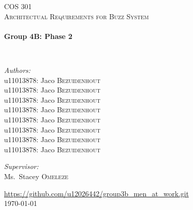 
\begin{titlepage}
\begin{center}


\textsc{\LARGE COS 301}\\[1.5cm]

\textsc{\large Architectual Requirements for Buzz System}\\[0.5cm]

\HRule \\[0.4cm]
{ \huge \bfseries Group 4B: Phase 2 \\[0.4cm] }

\HRule \\[1.5cm]

\noindent
\begin{minipage}{0.4\textwidth}
\begin{flushleft} \large
\emph{Authors:}\\
u11013878: Jaco \textsc{Bezuidenhout}\\
u11013878: Jaco \textsc{Bezuidenhout}\\
u11013878: Jaco \textsc{Bezuidenhout}\\
u11013878: Jaco \textsc{Bezuidenhout}\\
u11013878: Jaco \textsc{Bezuidenhout}\\
u11013878: Jaco \textsc{Bezuidenhout}\\
u11013878: Jaco \textsc{Bezuidenhout}\\
u11013878: Jaco \textsc{Bezuidenhout}

\end{flushleft}
\end{minipage}
\begin{minipage}{0.4\textwidth}
\begin{flushright} \large
\emph{Supervisor:} \\
Ms.~Stacey \textsc{Omeleze}
\end{flushright}
\end{minipage}





\vfill

\url{ https://github.com/u12026442/group3b_men_at_work.git}\\
{\large \today}

\end{center}
\end{titlepage}
